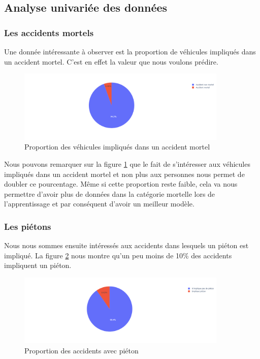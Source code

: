 \documentclass{article}
\begin{document}
    \subsection{Analyse univariée des données}
    \subsubsection{Les accidents mortels}
    Une donnée intéressante à observer est la proportion de véhicules impliqués dans un accident 
    mortel. C'est en effet la valeur que nous voulons prédire.

    \begin{figure}[ht]
        \centering
        \includegraphics[width=10cm]{./img/grav2.png}
        \caption{Proportion des véhicules impliqués dans un accident mortel}\label{fig:fig_acc_mortel}
    \end{figure}

    Nous pouvons remarquer sur la figure \ref{fig:fig_acc_mortel} que le fait de s'intéresser 
    aux véhicules impliqués dans un accident mortel et non plus aux personnes nous permet 
    de doubler ce pourcentage. Même si cette proportion reste faible, cela va nous permettre 
    d'avoir plus de données dans la catégorie mortelle lors de l'apprentissage et par conséquent 
    d'avoir un meilleur modèle.

    \subsubsection{Les piétons}
    Nous nous sommes ensuite intéressés aux accidents dans lesquels un piéton est impliqué. 
    La figure \ref{fig:fig_acc_pieton} nous montre qu'un peu moins de 10\% des accidents impliquent 
    un piéton.

    \begin{figure}[ht]
        \centering
        \includegraphics[width=10cm]{./img/pieton.png}
        \caption{Proportion des accidents avec piéton}\label{fig:fig_acc_pieton}
    \end{figure}
\end{document}
